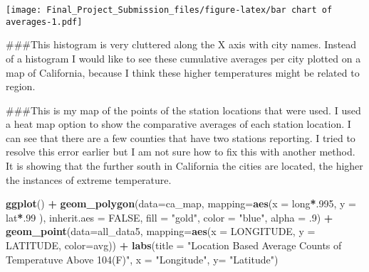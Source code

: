 \documentclass[]{article}
\newenvironment{Shaded}{\begin{snugshade}}{\end{snugshade}}
\newcommand{\DataTypeTok}[1]{\textcolor[rgb]{0.13,0.29,0.53}{#1}}
\newcommand{\DecValTok}[1]{\textcolor[rgb]{0.00,0.00,0.81}{#1}}
\newcommand{\FloatTok}[1]{\textcolor[rgb]{0.00,0.00,0.81}{#1}}
\newcommand{\KeywordTok}[1]{\textcolor[rgb]{0.13,0.29,0.53}{\textbf{#1}}}
\newcommand{\NormalTok}[1]{#1}
\newcommand{\OperatorTok}[1]{\textcolor[rgb]{0.81,0.36,0.00}{\textbf{#1}}}
\newcommand{\OtherTok}[1]{\textcolor[rgb]{0.56,0.35,0.01}{#1}}
\newcommand{\StringTok}[1]{\textcolor[rgb]{0.31,0.60,0.02}{#1}}
\begin{document}
\texttt{[image: Final\_Project\_Submission\_files/figure-latex/bar chart of averages-1.pdf]}

\#\#\#This histogram is very cluttered along the X axis with city names.
Instead of a histogram I would like to see these cumulative averages per
city plotted on a map of California, because I think these higher
temperatures might be related to region.

\begin{Shaded}
\end{Shaded}

\#\#\#This is my map of the points of the station locations that were
used. I used a heat map option to show the comparative averages of each
station location. I can see that there are a few counties that have two
stations reporting. I tried to resolve this error earlier but I am not
sure how to fix this with another method. It is showing that the further
south in California the cities are located, the higher the instances of
extreme temperature.

\begin{Shaded}
\begin{Highlighting}[]
\KeywordTok{ggplot}\NormalTok{() }\OperatorTok{+}
\StringTok{  }\KeywordTok{geom_polygon}\NormalTok{(}\DataTypeTok{data=}\NormalTok{ca_map, }\DataTypeTok{mapping=}\KeywordTok{aes}\NormalTok{(}\DataTypeTok{x =}\NormalTok{ long}\OperatorTok{*}\NormalTok{.}\DecValTok{995}\NormalTok{, }\DataTypeTok{y =}\NormalTok{ lat}\OperatorTok{*}\NormalTok{.}\DecValTok{99}\NormalTok{ ), }\DataTypeTok{inherit.aes =} \OtherTok{FALSE}\NormalTok{, }\DataTypeTok{fill =} \StringTok{"gold"}\NormalTok{, }\DataTypeTok{color =} \StringTok{"blue"}\NormalTok{, }\DataTypeTok{alpha =} \FloatTok{.9}\NormalTok{) }\OperatorTok{+}
\StringTok{  }\KeywordTok{geom_point}\NormalTok{(}\DataTypeTok{data=}\NormalTok{all_data5, }\DataTypeTok{mapping=}\KeywordTok{aes}\NormalTok{(}\DataTypeTok{x =}\NormalTok{ LONGITUDE, }\DataTypeTok{y =}\NormalTok{ LATITUDE, }\DataTypeTok{color=}\NormalTok{avg)) }\OperatorTok{+}\StringTok{ }\KeywordTok{labs}\NormalTok{(}\DataTypeTok{title =} \StringTok{"Location Based Average Counts of Temperatuve Above 104(F)"}\NormalTok{, }\DataTypeTok{x =} \StringTok{"Longitude"}\NormalTok{, }\DataTypeTok{y=} \StringTok{"Latitude"}\NormalTok{)}
\end{Highlighting}
\end{Shaded}
\end{document}
